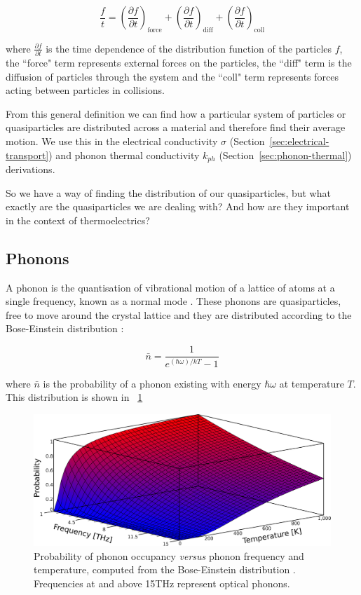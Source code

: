 \documentclass[12pt]{article}
\newcommand{\figref}[2][\figurename~]{#1\ref{#2}}
\newcommand{\secref}[2][Section~]{#1\ref{#2}}
\begin{document}
\begin{equation}
\label{eq:boltzmann-transport}
	\frac{f}{t} = \left(\frac{\partial f}{\partial
	t}\right)_\mathrm{force} + \left(\frac{\partial f}{\partial t}\right)_\mathrm{diff}+ \left(\frac{\partial f}{\partial t}\right)_\mathrm{coll}
\end{equation}

where $\frac{\partial f}{\partial t}$ is the time dependence of the distribution function of the particles $f$, the ``force" term represents external forces on the particles, the ``diff" term is the diffusion of particles through the system and the ``coll" term represents forces acting between particles in collisions.

From this general definition we can find how a particular system of particles or quasiparticles are distributed across a material and therefore find their average motion. We use this in the electrical conductivity $\sigma$ (\secref{sec:electrical-transport}) and phonon thermal conductivity $k_{ph}$ (\secref{sec:phonon-thermal}) derivations.

So we have a way of finding the distribution of our quasiparticles, but what exactly are the quasiparticles we are dealing with? And how are they important in the context of thermoelectrics?

\subsection{Phonons}
\label{sec:phonons}
A phonon is the quantisation of vibrational motion of a lattice of atoms at a single frequency, known as a normal mode \cite{kittel}. These phonons are quasiparticles, free to move around the crystal lattice and they are distributed according to the Bose-Einstein distribution \cite{kittel}:

\begin{equation}
\label{bose-einstein}
	 \bar{n} = \frac{1}{e^{(\hbar \omega) / k T} - 1}
\end{equation}

where $\bar{n}$ is the probability of a phonon existing with energy $\hbar \omega$ at temperature $T$. This distribution is shown in \figref{fig:3d-bose-einstein}

\begin{figure}
	\centering
	\includegraphics[width=\textwidth]{3d-bose-einstein.eps}
	\caption{Probability of phonon occupancy \emph{versus} phonon frequency and temperature, computed from the Bose-Einstein distribution \cite{kittel}. Frequencies at and above 15THz represent optical phonons.}
	\label{fig:3d-bose-einstein}
\end{figure}
\end{document}
